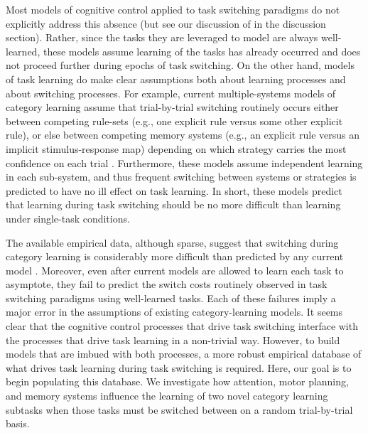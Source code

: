 \documentclass[doc, floatsintext]{apa7}
\begin{document}
Most models of cognitive control applied to task switching
paradigms do not explicitly address this absence
\parencite{botvinick_conflict_2001, gilbert_task_2002,
    blais_item-specific_2007, brown_computational_2007,
verguts_hebbian_2008, abrahamse_grounding_2016} (but see our
discussion of \cite{collins_cognitive_2013} in the
discussion section).  Rather, since the tasks they are
leveraged to model are always well-learned, these models
assume learning of the tasks has already occurred and does
not proceed further during epochs of task switching. On the
other hand, models of task learning do make clear
assumptions both about learning processes and about
switching processes. For example, current multiple-systems
models of category learning assume that trial-by-trial
switching routinely occurs either between competing
rule-sets (e.g., one explicit rule versus some other
explicit rule), or else between competing memory systems
(e.g., an explicit rule versus an implicit stimulus-response
map) depending on which strategy carries the most confidence
on each trial \parencite{ashby_neuropsychological_1998,
erickson_rules_1998}. Furthermore, these models assume
independent learning in each sub-system, and thus frequent
switching between systems or strategies is predicted to have
no ill effect on task learning. In short, these models
predict that learning during task switching should be no
more difficult than learning under single-task conditions.

The available empirical data, although sparse, suggest that
switching during category learning is considerably more
difficult than predicted by any current model
\parencite{crossley_trial-by-trial_2018,
erickson_executive_2008, helie_categorization_2018}.
Moreover, even after current models are allowed to learn
each task to asymptote, they fail to predict the switch
costs routinely observed in task switching paradigms using
well-learned tasks. Each of these failures imply a major
error in the assumptions of existing category-learning
models. It seems clear that the cognitive control processes
that drive task switching interface with the processes that
drive task learning in a non-trivial way. However, to build
models that are imbued with both processes, a more robust
empirical database of what drives task learning during task
switching is required. Here, our goal is to begin populating
this database. We investigate how attention, motor planning,
and memory systems influence the learning of two novel
category learning subtasks when those tasks must be switched
between on a random trial-by-trial basis.
\end{document}
